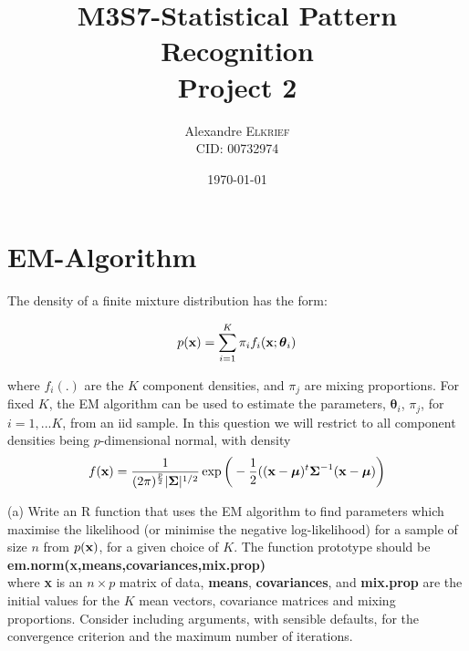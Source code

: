 \documentclass{article}
\title{M3S7-Statistical Pattern Recognition  \\ Project 2} %
\author{Alexandre \textsc{Elkrief}\\ CID: 00732974} %
\date{\today} %
\begin{document}
\maketitle %




\section{EM-Algorithm}

The density of a finite mixture distribution has the form:

$$p(\textbf x) = \sum_{i=1}^{K} \pi_{i} f_{i}(\textbf x; \boldsymbol \theta_{i})$$

where $f_i(.)$ are the $K$ component densities, and $\pi_{j}$ are mixing proportions. For fixed $K$, the EM algorithm can be used to estimate the parameters, $\boldsymbol \theta_{i}$, $\pi_{j}$, for $i = 1,...K$, from an iid sample. In this question we will restrict to all component densities being $p$-dimensional normal, with density
\\
$$f(\textbf x)=\frac{1}{(2\pi)^{\frac{p}{2}}|\boldsymbol \Sigma|^{1/2}} \exp \bigg(-\frac{1}{2}((\textbf x- \boldsymbol \mu)^{t} \boldsymbol \Sigma^{-1} (\textbf x- \boldsymbol \mu) \bigg)$$


(a) Write an R function that uses the EM algorithm to find parameters which maximise the likelihood (or minimise the negative log-likelihood) for a sample of size $n$ from $p(\textbf x)$, for a given choice of $K$. The function prototype should be \\

\textbf{em.norm(x,means,covariances,mix.prop)}\\

where \textbf x is an $n \times p$ matrix of data, \textbf{means}, \textbf{covariances}, and \textbf{mix.prop} are the initial values for the $K$ mean vectors, covariance matrices and mixing proportions. Consider including arguments, with sensible defaults, for the convergence criterion and the maximum number of iterations. \\
\end{document}

